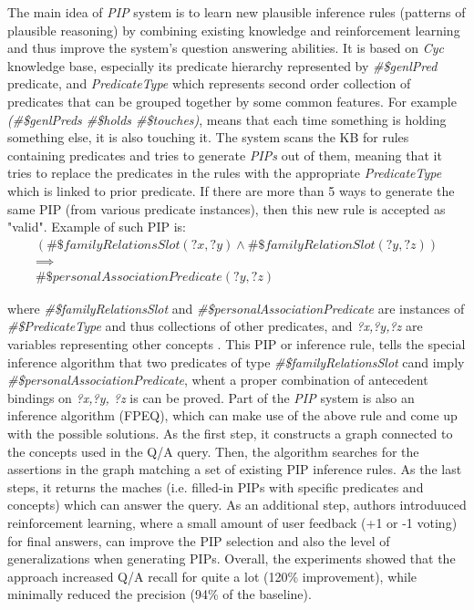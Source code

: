 \label{section:rw_PIP}
The main idea of \emph{PIP} system is to learn new plausible inference rules 
(patterns of plausible reasoning) by combining existing knowledge and 
reinforcement learning and thus improve the system's question answering
abilities\parencite{Sharma2010}. It is based on \emph{Cyc} knowledge base,
especially its predicate hierarchy represented by \emph{\#\$genlPred} predicate, 
and \emph{PredicateType} which represents second order collection of predicates 
that can be grouped together by some common features. For example
\emph{(\#\$genlPreds \#\$holds \#\$touches)}, means that each time something is 
holding something else, it is also touching it. The system scans the KB for rules 
containing predicates and tries to generate \emph{PIPs} out of them, meaning
that it tries to replace the predicates in the rules with the appropriate
\emph{PredicateType} which is linked to prior predicate. If there are more
than 5 ways to generate the same PIP (from various predicate instances), then
this new rule is accepted as "valid". Example of such PIP is:
\begin{gather*}
(\#\$familyRelationsSlot(?x,?y) \land \#\$familyRelationSlot(?y,?z)) \\
\implies \\ 
\#\$personalAssociationPredicate(?y,?z)
\end{gather*}

where \emph{\#\$familyRelationsSlot} and \emph{\#\$personalAssociationPredicate}
are instances of \emph{\#\$PredicateType} and thus collections of other 
predicates, and \emph{?x,?y,?z} are variables representing other concepts
\parencite{sharma2010}. This PIP or inference rule, tells the special inference
algorithm that two predicates of type \emph{\#\$familyRelationsSlot} cand
imply \emph{\#\$personalAssociationPredicate}, whent a proper combination
of antecedent bindings on \emph{?x,?y, ?z} is can be proved. Part of the 
\emph{PIP} system is also an inference algorithm (FPEQ), which can make use of 
the above rule and come up with the possible solutions. As the first step, it 
constructs a graph connected to the concepts used in the Q/A query. Then, the
algorithm searches for the assertions in the graph matching a set of existing
PIP inference rules. As the last steps, it returns the maches (i.e. filled-in
PIPs with specific predicates and concepts) which can answer the query.
As an additional step, authors introduuced reinforcement learning, where a small
amount of user feedback (+1 or -1 voting) for final answers, can improve the
PIP selection and also the level of generalizations when generating PIPs.
Overall, the experiments showed that the approach increased Q/A recall for 
quite a lot (120\% improvement), while minimally reduced the precision (94\% of
the baseline)\parencite{Zang2013}.


